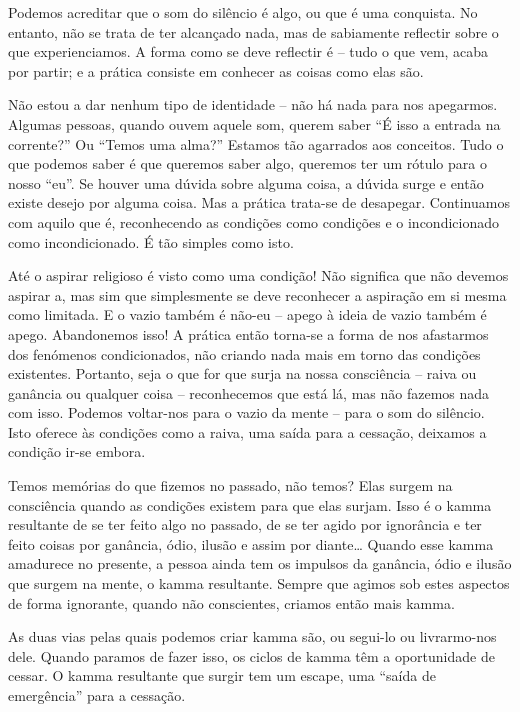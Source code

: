 Podemos acreditar que o som do silêncio é algo, ou que é uma conquista. No
entanto, não se trata de ter alcançado nada, mas de sabiamente reflectir sobre o
que experienciamos. A forma como se deve reflectir é -- tudo o que vem, acaba
por partir; e a prática consiste em conhecer as coisas como elas são.

Não estou a dar nenhum tipo de identidade -- não há nada para nos apegarmos.
Algumas pessoas, quando ouvem aquele som, querem saber ``É isso a entrada na
corrente?'' Ou ``Temos uma alma?'' Estamos tão agarrados aos conceitos. Tudo o
que podemos saber é que queremos saber algo, queremos ter um rótulo para o nosso
``eu''. Se houver uma dúvida sobre alguma coisa, a dúvida surge e então existe
desejo por alguma coisa. Mas a prática trata-se de desapegar. Continuamos com
aquilo que é, reconhecendo as condições como condições e o incondicionado como
incondicionado. É tão simples como isto.

Até o aspirar religioso é visto como uma condição! Não significa que não devemos
aspirar a, mas sim que simplesmente se deve reconhecer a aspiração em si mesma
como limitada. E o vazio também é não-eu -- apego à ideia de vazio também é
apego. Abandonemos isso! A prática então torna-se a forma de nos afastarmos dos
fenómenos condicionados, não criando nada mais em torno das condições
existentes. Portanto, seja o que for que surja na nossa consciência -- raiva ou
ganância ou qualquer coisa -- reconhecemos que está lá, mas não fazemos nada com
isso. Podemos voltar-nos para o vazio da mente -- para o som do silêncio. Isto
oferece às condições como a raiva, uma saída para a cessação, deixamos a
condição ir-se embora.

Temos memórias do que fizemos no passado, não temos? Elas surgem na consciência
quando as condições existem para que elas surjam. Isso é o kamma resultante de
se ter feito algo no passado, de se ter agido por ignorância e ter feito coisas
por ganância, ódio, ilusão e assim por diante\ldots{} Quando esse kamma
amadurece no presente, a pessoa ainda tem os impulsos da ganância, ódio e ilusão
que surgem na mente, o kamma resultante. Sempre que agimos sob estes aspectos de
forma ignorante, quando não conscientes, criamos então mais kamma.

As duas vias pelas quais podemos criar kamma são, ou segui-lo ou livrarmo-nos
dele. Quando paramos de fazer isso, os ciclos de kamma têm a oportunidade de
cessar. O kamma resultante que surgir tem um escape, uma ``saída de emergência''
para a cessação.
